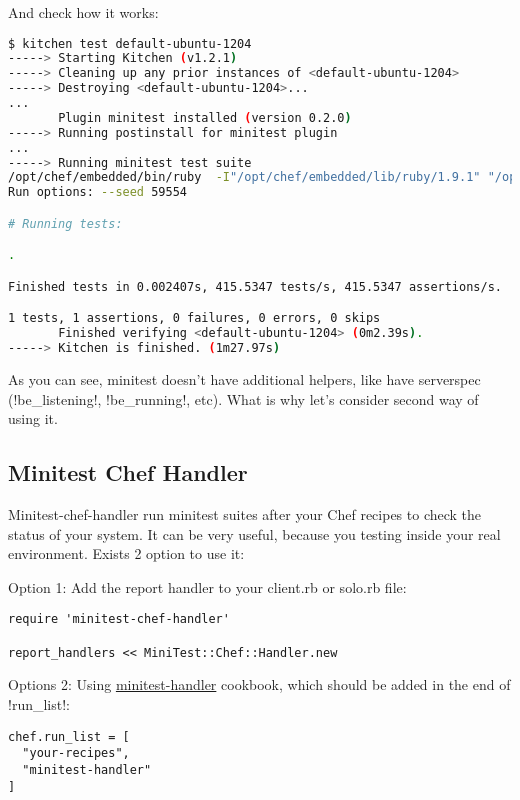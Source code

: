 And check how it works:

\begin{lstlisting}[language=Bash,label=lst:testing-minitest2]
$ kitchen test default-ubuntu-1204
-----> Starting Kitchen (v1.2.1)
-----> Cleaning up any prior instances of <default-ubuntu-1204>
-----> Destroying <default-ubuntu-1204>...
...
       Plugin minitest installed (version 0.2.0)
-----> Running postinstall for minitest plugin
...
-----> Running minitest test suite
/opt/chef/embedded/bin/ruby  -I"/opt/chef/embedded/lib/ruby/1.9.1" "/opt/chef/embedded/lib/ruby/1.9.1/rake/rake_test_loader.rb" "/tmp/busser/suites/minitest/test_default.rb"
Run options: --seed 59554

# Running tests:

.

Finished tests in 0.002407s, 415.5347 tests/s, 415.5347 assertions/s.

1 tests, 1 assertions, 0 failures, 0 errors, 0 skips
       Finished verifying <default-ubuntu-1204> (0m2.39s).
-----> Kitchen is finished. (1m27.97s)
\end{lstlisting}

As you can see, minitest doesn't have additional helpers, like have serverspec (\inline!be_listening!, \inline!be_running!, etc). What is why let's consider second way of using it.

\subsection{Minitest Chef Handler}

Minitest-chef-handler run minitest suites after your Chef recipes to check the status of your system. It can be very useful, because you testing inside your real environment. Exists 2 option to use it:

Option 1: Add the report handler to your client.rb or solo.rb file:

\begin{lstlisting}[label=lst:testing-minitest3]
require 'minitest-chef-handler'

report_handlers << MiniTest::Chef::Handler.new
\end{lstlisting}

Options 2: Using \href{https://github.com/btm/minitest-handler-cookbook}{minitest-handler} cookbook, which should be added in the end of \inline!run_list!:

\begin{lstlisting}[label=lst:testing-minitest4]
chef.run_list = [
  "your-recipes",
  "minitest-handler"
]
\end{lstlisting}

